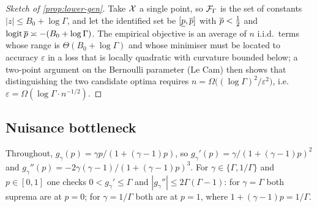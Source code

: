 \begin{proof}[Sketch of \cref{prop:lower-gen}]
Take $\mathcal{X}$ a single point, so $\mathcal{F}_\Gamma$ is the set of constants
$|z|\le B_0+\log\Gamma$, and let the identified set be
$[\underline{p},\overline{p}]$ with $\overline{p}<\tfrac12$ and $\operatorname{logit}\overline{p}\asymp-(B_0+\log\Gamma)$. The
empirical objective is an average of $n$ i.i.d.\ terms whose range is
$\Theta(B_0+\log\Gamma)$ and whose minimiser must be located to accuracy
$\varepsilon$ in a loss that is locally quadratic with curvature bounded below;
a two-point argument on the Bernoulli parameter (Le Cam) then shows that
distinguishing the two candidate optima requires
$n = \Omega\big((\log\Gamma)^2/\varepsilon^2\big)$, i.e.\
$\varepsilon = \Omega(\log\Gamma\cdot n^{-1/2})$.
\end{proof}

\subsection{Nuisance bottleneck}
\label{app:nuisance}

Throughout, $g_\gamma(p)=\gamma p/(1+(\gamma-1)p)$, so
$g_\gamma'(p)=\gamma/(1+(\gamma-1)p)^2$ and
$g_\gamma''(p)=-2\gamma(\gamma-1)/(1+(\gamma-1)p)^3$. For
$\gamma\in\{\Gamma,1/\Gamma\}$ and $p\in[0,1]$ one checks
$0<g_\gamma'\le\Gamma$ and $|g_\gamma''|\le2\Gamma(\Gamma-1)$: for
$\gamma=\Gamma$ both suprema are at $p=0$; for $\gamma=1/\Gamma$ both are at
$p=1$, where $1+(\gamma-1)p=1/\Gamma$.

